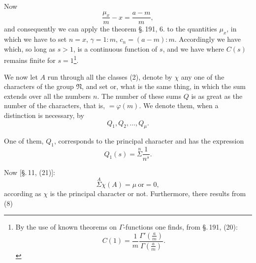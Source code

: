 
Now
\[
\frac{\mu_x}{m} - x = \frac{a-m}{m},
\]
and consequently we can apply the theorem \S.\,191, 6. to the quantities
$\mu_x$, in which we have to set $n = x$, $\gamma = 1:m$, $c_n = (a-m):m$.
Accordingly we have
which, so long as $s > 1$, is a continuous function of $s$, and we have
where $C(s)$ remains finite for $s=1$\footnote{By the use of known
theorems on $\Gamma$-functions one finds, from \S.\,191, (20):
\[
C(1) = \frac{1}{m} \frac{\Gamma'\left(\frac{a}{m}\right)}{\Gamma\left(\frac{a}{m}\right)}.
\]}.

We now let $A$ run through all the classes (2), denote by
$\chi$ any one of the characters of the group $\mathfrak{N}$, and set
or, what is the same thing,
in which the sum extends over all the numbers $n$. The number of these sums
$Q$ is as great as the number of the characters, that is, $= \varphi(m)$. We
denote them, when a distinction is necessary, by
\[
Q_1, Q_2, \ldots, Q_\mu.
\]

One of them, $Q_1$, corresponds to the principal character and has the expression
\[
Q_1(s) = \overset{n}{\Sigma} \frac{1}{n^s}.
\]

Now [\S.\,11, (21)]:
\[
\overset{A}{\Sigma} \chi(A) = \mu \ \text{or} = 0,
\]
according as $\chi$ is the principal character or not. Furthermore, there
results from (8)
